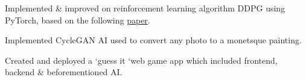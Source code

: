 \documentclass[]{CV}
\begin{document}
\begin{minipage}[t]{0.705\textwidth}
\begin{tightemize}
\item Implemented \& improved on reinforcement learning algorithm DDPG using PyTorch, based on the following \href{https://arxiv.org/abs/1509.0297[]}{paper}. 

\end{tightemize}

\begin{tightemize}

\item Implemented CycleGAN AI used to convert any photo to a monetsque painting.

\item Created and deployed a `guess it `web game app which included frontend, backend \& beforementioned AI.

\end{tightemize}
\sectionsep








%
%

\end{minipage} 
\end{document}
